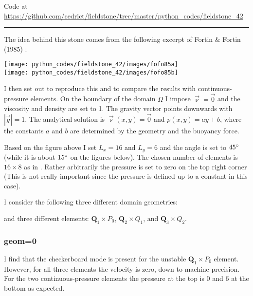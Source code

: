 

\begin{center}
Code at \url{https://github.com/cedrict/fieldstone/tree/master/python_codes/fieldstone_42}
\end{center}

\par\noindent\rule{\textwidth}{0.4pt}



The idea behind this stone comes from the following excerpt of Fortin \& Fortin (1985) \cite{fofo85}:
\begin{center}
\texttt{[image: python\_codes/fieldstone\_42/images/fofo85a]}\\
\texttt{[image: python\_codes/fieldstone\_42/images/fofo85b]}
\end{center}

I then set out to reproduce this and to compare the results with continuous-pressure elements.
On the boundary of the domain $\Omega$ I impose $\vec\upnu=\vec{0}$ and 
the viscosity and density are set to 1. The gravity vector points downwards
with $|\vec{g}|=1$.
The analytical solution is $\vec\upnu(x,y)=\vec{0}$ and $p(x,y)=ay+b$, 
where the constants $a$ and $b$ are determined by the geometry and the buoyancy force.

Based on the figure above I set $L_x=16$ and $L_y=6$ and the angle is set to $45\degree$ (while it 
is about $15\degree$ on the figures below).
The chosen number of elements is $16\times 8$ as in \cite{fofo85}.
Rather arbitrarily the pressure is set to zero on the top right corner (This is not really
important since the pressure is defined up to a constant in this case).

I consider the following three different domain geometries:
\begin{center}

\end{center}
and three different elements: ${\bm Q}_1\times P_0$, ${\bm Q}_2\times Q_1$, and ${\bm Q}_3\times Q_2$.

\subsubsection*{geom=0}

I find that the checkerboard mode is present for the unstable ${\bm Q}_1\times P_0$
element. However, for all three elements the velocity is zero, down to machine precision.
For the two continuous-pressure elements the pressure at the top is 0 and 6 at the 
bottom as expected.

